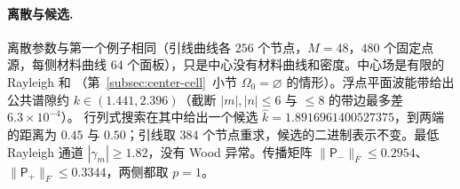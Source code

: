 \paragraph{离散与候选.}
离散参数与第一个例子相同（引线曲线各 $256$ 个节点，$M=48$，$480$ 个固定点源，每侧材料曲线
$64$ 个面板），只是中心没有材料曲线和密度。中心场是有限的 Rayleigh 和
（第~\ref{subsec:center-cell}~小节 $\Omega_0=\varnothing$ 的情形）。浮点平面波能带给出
公共谱隙约 $k\in(1.441,2.396)$（截断 $|m|,|n|\le6$ 与 $\le8$ 的带边最多差 $6.3\times10^{-4}$）。
行列式搜索在其中给出一个候选 $\widehat k=1.8916961400527375$，到两端的距离为 $0.45$ 与
$0.50$；引线取 $384$ 个节点重求，候选的二进制表示不变。最低 Rayleigh 通道
$|\gamma_m|\geq1.82$，没有 Wood 异常。传播矩阵 $\lVert\mathsf P_-\rVert_F\le0.2954$、
$\lVert\mathsf P_+\rVert_F\le0.3344$，两侧都取 $p=1$。


